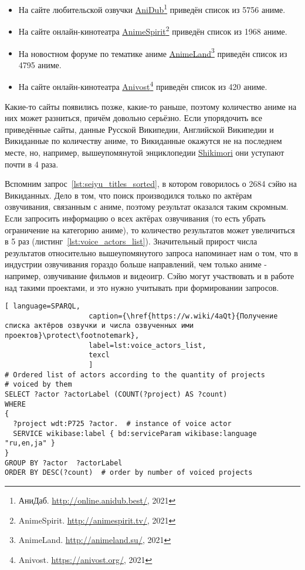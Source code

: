 \begin{itemize}
	\item На сайте любительской озвучки \href{http://online.anidub.best/}{AniDub}\footnote{АниДаб. \href{http://online.anidub.best/}{http://online.anidub.best/}, 2021} приведён список из \num{5756} аниме.
	\item На сайте онлайн-кинотеатра \href{http://animespirit.tv/}{AnimeSpirit}\footnote{AnimeSpirit. \href{http://animespirit.tv/}{http://animespirit.tv/}, 2021} приведён список из \num{1968} аниме.
	\item На новостном форуме по тематике аниме \href{http://animeland.su/}{AnimeLand}\footnote{AnimeLand. \href{http://animeland.su/}{http://animeland.su/}, 2021} приведён список из \num{4795} аниме.
	\item На сайте онлайн-кинотеатра \href{https://anivost.org/}{Anivost}\footnote{Anivost. \href{https://anivost.org/}{https://anivost.org/}, 2021} приведён список из \num{420} аниме.
\end{itemize}

Какие-то сайты появились позже, какие-то раньше, поэтому количество аниме на них может разниться, причём довольно серьёзно. Если упорядочить все приведённые сайты, данные Русской Википедии, Английской Википедии и Викиданные по количеству аниме, то Викиданные окажутся не на последнем месте, но, например, вышеупомянутой энциклопедии \href{https://shikimori.one/}{Shikimori} они уступают почти в 4 раза.

Вспомним запрос~\ref{lst:seiyu_titles_sorted}, в котором говорилось о \num{2684} сэйю на Викиданных. Дело в том, что поиск производился только по актёрам озвучивания, связанным с аниме, поэтому результат оказался таким скромным. Если запросить информацию о всех актёрах озвучивания (то есть убрать ограничение на категорию аниме), то количество результатов может увеличиться в \num{5} раз (листинг~\ref{lst:voice_actors_list}). Значительный прирост числа результатов относительно вышеупомянутого запроса напоминает нам о том, что в индустрии озвучивания гораздо больше направлений, чем только аниме - например, озвучивание фильмов и видеоигр. Сэйю могут участвовать и в работе над такими проектами, и это нужно учитывать при формировании запросов. 

\begin{lstlisting}[ language=SPARQL, 
                    caption={\href{https://w.wiki/4aQt}{Получение списка актёров озвучки и числа озвученных ими проектов}\protect\footnotemark},
                    label=lst:voice_actors_list,
                    texcl 
                    ]
# Ordered list of actors according to the quantity of projects
# voiced by them
SELECT ?actor ?actorLabel (COUNT(?project) AS ?count)
WHERE
{
  ?project wdt:P725 ?actor.	 # instance of voice actor
  SERVICE wikibase:label { bd:serviceParam wikibase:language "ru,en,ja" }
}
GROUP BY ?actor  ?actorLabel
ORDER BY DESC(?count)  # order by number of voiced projects
\end{lstlisting}%


